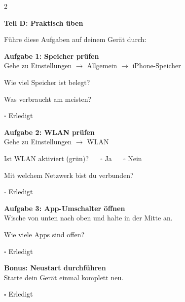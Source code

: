 \documentclass[a4paper,landscape,8pt]{extarticle}
\begin{document}
\begin{multicols}{2}
\columnbreak

\textbf{\large Teil D: Praktisch üben}

Führe diese Aufgaben auf deinem Gerät durch:

\vspace{3mm}

\textbf{Aufgabe 1: Speicher prüfen}\\
Gehe zu Einstellungen $\rightarrow$ Allgemein $\rightarrow$ iPhone-Speicher

\vspace{2mm}
Wie viel Speicher ist belegt? \dotfill

\vspace{2mm}
Was verbraucht am meisten? \dotfill

\vspace{2mm}
$\square$ Erledigt

\vspace{5mm}

\textbf{Aufgabe 2: WLAN prüfen}\\
Gehe zu Einstellungen $\rightarrow$ WLAN

\vspace{2mm}
Ist WLAN aktiviert (grün)? ~~ $\square$ Ja ~~ $\square$ Nein

\vspace{2mm}
Mit welchem Netzwerk bist du verbunden? \dotfill

\vspace{2mm}
$\square$ Erledigt

\vspace{5mm}

\textbf{Aufgabe 3: App-Umschalter öffnen}\\
Wische von unten nach oben und halte in der Mitte an.

\vspace{2mm}
Wie viele Apps sind offen? \dotfill

\vspace{2mm}
$\square$ Erledigt

\vspace{5mm}

\textbf{Bonus: Neustart durchführen}\\
Starte dein Gerät einmal komplett neu.

\vspace{2mm}
$\square$ Erledigt

\end{multicols}

\newpage

\end{document}
